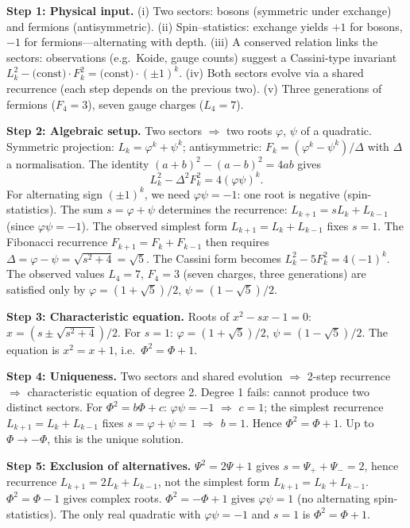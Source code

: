 \documentclass[12pt,a4paper]{article}
\begin{document}
\medskip
\noindent\textbf{Step 1: Physical input.} (i) Two sectors: bosons (symmetric under exchange) and fermions (antisymmetric). (ii) Spin--statistics: exchange yields $+1$ for bosons, $-1$ for fermions---alternating with depth. (iii) A conserved relation links the sectors: observations (e.g.\ Koide, gauge counts) suggest a Cassini-type invariant $L_k^2 - \text{(const)} \cdot F_k^2 = \text{(const)} \cdot (\pm 1)^k$. (iv) Both sectors evolve via a shared recurrence (each step depends on the previous two). (v) Three generations of fermions ($F_4 = 3$), seven gauge charges ($L_4 = 7$).

\medskip
\noindent\textbf{Step 2: Algebraic setup.} Two sectors $\Rightarrow$ two roots $\varphi$, $\psi$ of a quadratic. Symmetric projection: $L_k = \varphi^k + \psi^k$; antisymmetric: $F_k = (\varphi^k - \psi^k)/\Delta$ with $\Delta$ a normalisation. The identity $(a+b)^2 - (a-b)^2 = 4ab$ gives
\begin{equation}
L_k^2 - \Delta^2 F_k^2 = 4(\varphi\psi)^k.
\end{equation}
For alternating sign $(\pm 1)^k$, we need $\varphi\psi = -1$: one root is negative (spin-statistics). The sum $s = \varphi + \psi$ determines the recurrence: $L_{k+1} = s L_k + L_{k-1}$ (since $\varphi\psi = -1$). The observed simplest form $L_{k+1} = L_k + L_{k-1}$ fixes $s = 1$. The Fibonacci recurrence $F_{k+1} = F_k + F_{k-1}$ then requires $\Delta = \varphi - \psi = \sqrt{s^2 + 4} = \sqrt{5}$. The Cassini form becomes $L_k^2 - 5F_k^2 = 4(-1)^k$. The observed values $L_4 = 7$, $F_4 = 3$ (seven charges, three generations) are satisfied only by $\varphi = (1+\sqrt{5})/2$, $\psi = (1-\sqrt{5})/2$.

\medskip
\noindent\textbf{Step 3: Characteristic equation.} Roots of $x^2 - s x - 1 = 0$: $x = (s \pm \sqrt{s^2+4})/2$. For $s = 1$: $\varphi = (1+\sqrt{5})/2$, $\psi = (1-\sqrt{5})/2$. The equation is $x^2 = x + 1$, i.e.\ $\Phi^2 = \Phi + 1$.

\medskip
\noindent\textbf{Step 4: Uniqueness.} Two sectors and shared evolution $\Rightarrow$ 2-step recurrence $\Rightarrow$ characteristic equation of degree 2. Degree 1 fails: cannot produce two distinct sectors. For $\Phi^2 = b\Phi + c$: $\varphi\psi = -1$ $\Rightarrow$ $c = 1$; the simplest recurrence $L_{k+1} = L_k + L_{k-1}$ fixes $s = \varphi + \psi = 1$ $\Rightarrow$ $b = 1$. Hence $\Phi^2 = \Phi + 1$. Up to $\Phi \to -\Phi$, this is the unique solution.

\medskip
\noindent\textbf{Step 5: Exclusion of alternatives.} $\Psi^2 = 2\Psi + 1$ gives $s = \Psi_+ + \Psi_- = 2$, hence recurrence $L_{k+1} = 2L_k + L_{k-1}$, not the simplest form $L_{k+1} = L_k + L_{k-1}$. $\Phi^2 = \Phi - 1$ gives complex roots. $\Phi^2 = -\Phi + 1$ gives $\varphi\psi = 1$ (no alternating spin-statistics). The only real quadratic with $\varphi\psi = -1$ and $s = 1$ is $\Phi^2 = \Phi + 1$.
\end{document}
